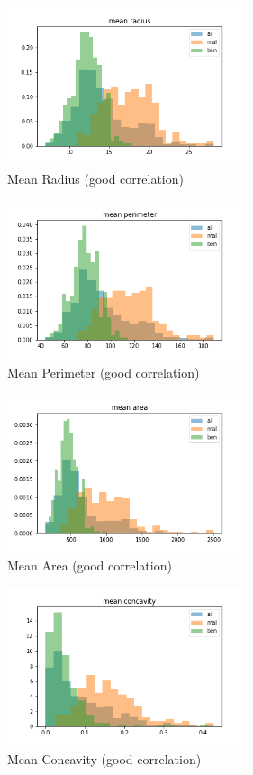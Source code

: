 \documentclass[conference]{IEEEtran}
\begin{document}
\begin{figure}[htbp]
\centerline{\includegraphics [width = 7cm] {mean radius.png}}
\caption{Mean Radius (good correlation)}
\label{fig}
\end{figure}
\begin{figure}[htbp]
\centerline{\includegraphics [width = 7cm] {mean perimeter.png}}
\caption{Mean Perimeter (good correlation)}
\label{fig}
\end{figure}
\begin{figure}[htbp]
\centerline{\includegraphics [width = 7cm] {mean area.png}}
\caption{Mean Area (good correlation)}
\label{fig}
\end{figure}
\begin{figure}[htbp]
\centerline{\includegraphics [width = 7cm] {mean concavity.png}}
\caption{Mean Concavity (good correlation)}
\label{fig}
\end{figure}
\end{document}
